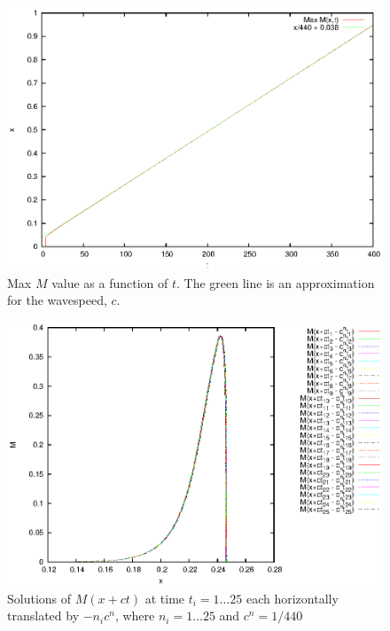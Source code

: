 \documentclass{report}
\begin{document}
\begin{figure}[h!tb]
\begin{center}
    \includegraphics[scale=0.85]{wavespeed.eps}
    \caption{Max $M$ value as a function of $t$. The green line is an approximation for the wavespeed, $c$.}
    \label{fig:waveSpeed} 
\end{center}
\end{figure}

\begin{figure}[h!tb]
\begin{center}
    \includegraphics[scale=0.85]{travShape.eps}
    \caption{Solutions of $M(x+ct)$ at time $t_i = 1 \ldots 25$ each horizontally translated by $-n_i c^n$, where $n_i = 1 \ldots 25$ and $c^n = 1/440$}
    \label{fig:travShape}
\end{center}
\end{figure}
\end{document}
